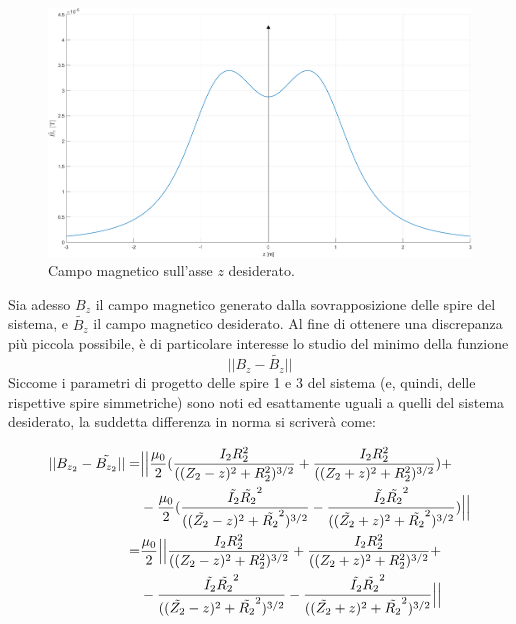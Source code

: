 \documentclass[a4paper, 11pt]{article}
\begin{document}
\begin{figure}[H]
    \centering
    \includegraphics[width=16cm]{assets/figure2}
    \caption{Campo magnetico sull'asse $z$ desiderato.}
\end{figure}
\noindent
Sia adesso $B_{z}$ il campo magnetico generato dalla sovrapposizione delle spire
del sistema, e $\tilde{B_{z}}$ il campo magnetico desiderato. Al fine di
ottenere una discrepanza più piccola possibile, è di particolare interesse lo
studio del minimo della funzione
\[||B_{z}-\tilde{B_{z}}||\] Siccome i parametri di progetto delle spire 1 e 3
del sistema (e, quindi, delle rispettive spire simmetriche) sono noti ed
esattamente uguali a quelli del sistema desiderato, la suddetta differenza in
norma si scriverà come:

\begin{equation}
    \begin{split}
        ||B_{z_{2}}-\tilde{B_{z_{2}}}||
        =& \Bigl|\Bigl|\frac{\mu_{0}}{2}(\frac{I_{2}R_{2}^{2}}{((Z_{2}-z)^{2}+R_{2}^{2})^{3/2}}+\frac{I_{2}R_{2}^{2}}{((Z_{2}+z)^{2}+R_{2}^{2})^{3/2}})+ \\
         & -\frac{\mu_{0}}{2}(\frac{\tilde{I_{2}}\tilde{R_{2}}^{2}}{((\tilde{Z_{2}}-z)^{2}+\tilde{R_{2}}^{2})^{3/2}}-\frac{\tilde{I_{2}}\tilde{R_{2}}^{2}}{((\tilde{Z_{2}}+z)^{2}+\tilde{R_{2}}^{2})^{3/2}})\Bigr|\Bigr| \\
        =& \frac{\mu_{0}}{2}\Bigl|\Bigl|\frac{I_{2}R_{2}^{2}}{((Z_{2}-z)^{2}+R_{2}^{2})^{3/2}}+\frac{I_{2}R_{2}^{2}}{((Z_{2}+z)^{2}+R_{2}^{2})^{3/2}}+ \\
         & -\frac{\tilde{I_{2}}\tilde{R_{2}}^{2}}{((\tilde{Z_{2}}-z)^{2}+\tilde{R_{2}}^{2})^{3/2}}-\frac{\tilde{I_{2}}\tilde{R_{2}}^{2}}{((\tilde{Z_{2}}+z)^{2}+\tilde{R_{2}}^{2})^{3/2}}\Bigr|\Bigr|
    \end{split} 
\end{equation}
\noindent
\end{document}
